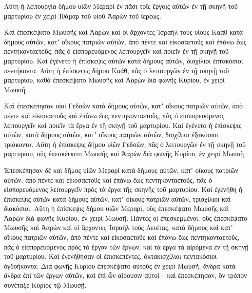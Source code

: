 {Αὕτη ἡ λειτουργία δήμου υἱῶν Μεραρὶ ἐν πᾶσι τοῖς ἔργοις αὐτῶν ἐν τῇ σκηνῇ τοῦ μαρτυρίου ἐν χειρὶ Ἰθάμαρ τοῦ υἱοῦ Ἀαρὼν τοῦ ἱερέως.
\par }{\PP {}Καὶ ἐπεσκέψατο Μωυσῆς καὶ Ἀαρὼν καὶ οἱ ἄρχοντες Ἰσραὴλ τοὺς υἱοὺς Καὰθ κατὰ δήμους αὐτῶν, κατʼ οἴκους πατριῶν αὐτῶν,
ἀπὸ πέντε καὶ εἰκοσαετοῦς καὶ ἐπάνω ἕως πεντηκονταετοῦς, πᾶς ὁ εἰσπορευόμενος λειτουργεῖν καὶ ποιεῖν ἐν τῇ σκηνῇ τοῦ μαρτυρίου.
Καὶ ἐγένετο ἡ ἐπίσκεψις αὐτῶν κατὰ δήμους αὐτῶν, δισχίλιοι ἑπτακόσιοι πεντήκοντα.
Αὕτη ἡ ἐπίσκεψις δήμου Καάθ, πᾶς ὁ λειτουργῶν ἐν τῇ σκηνῇ τοῦ μαρτυρίου, καθὰ ἐπεσκέψατο Μωυσῆς καὶ Ἀαρὼν διὰ φωνῆς Κυρίου, ἐν χειρὶ Μωυσῆ.
\par }{\PP {}Καὶ ἐπεσκέπησαν υἱοὶ Γεδσὼν κατὰ δήμους αὐτῶν, κατʼ οἴκους πατριῶν αὐτῶν,
ἀπὸ πέντε καὶ εἰκοσαετοῦς καὶ ἐπάνω ἕως πεντηκονταετοῦς, πᾶς ὁ εἰσπορευόμενος λειτουργεῖν καὶ ποιεῖν τὰ ἔργα ἐν τῇ σκηνῇ τοῦ μαρτυρίου.
Καὶ ἐγένετο ἡ ἐπίσκεψις αὐτῶν, κατὰ δήμους αὐτῶν, κατʼ οἴκους πατριῶν αὐτῶν, δισχίλιοι ἑξακόσιοι τριάκοντα.
Αὕτη ἡ ἐπίσκεψις δήμου υἱῶν Γεδσὼν, πᾶς ὁ λειτουργῶν ἐν τῇ σκηνῇ τοῦ μαρτυρίου, οὓς ἐπεσκέψατο Μωυσῆς καὶ Ἀαρὼν διὰ φωνῆς Κυρίου, ἐν χειρὶ Μωυσῆ.
\par }{\PP {}Ἐπεσκέπησαν δὲ καὶ δῆμος υἱῶν Μεραρὶ κατὰ δήμους αὐτῶν, κατʼ οἴκους πατριῶν αὐτῶν,
ἀπὸ πέντε καὶ εἰκοσαετοῦς καὶ ἐπάνω ἕως πεντηκονταετοῦς, πᾶς ὁ εἰσπορευόμενος λειτουργεῖν πρὸς τὰ ἔργα τῆς σκηνῆς τοῦ μαρτυρίου.
Καὶ ἐγενήθη ἡ ἐπίσκεψις αὐτῶν κατὰ δήμους αὐτῶν, κατʼ οἴκους πατριῶν αὐτῶν, τρισχίλιοι καὶ διακόσιοι.
Αὕτη ἡ ἐπίσκεψις δήμου υἱῶν Μεραρὶ, οὓς ἐπεσκέψατο Μωυσῆς καὶ Ἀαρὼν διὰ φωνῆς Κυρίου, ἐν χειρὶ Μωυσῆ.
Πάντες οἱ ἐπεσκεμμένοι, οὓς ἐπεσκέψατο Μωυσῆς καὶ Ἀαρὼν καὶ οἱ ἄρχοντες Ἰσραὴλ τοὺς Λευίτας, κατὰ δήμους καὶ κατʼ οἴκους πατριῶν αὐτῶν,
ἀπὸ πέντε καὶ εἰκοσαετοῦς καὶ ἐπάνω ἕως πεντηκονταετοῦς, πᾶς ὁ εἰσπορευόμενος πρὸς τὸ ἔργον τῶν ἔργων, καὶ τὰ ἔργα τὰ αἰρόμενα ἐν τῇ σκηνῇ τοῦ μαρτυρίου.
Καὶ ἐγενήθησαν οἱ ἐπισκεπέντες, ὀκτακισχίλιοι πεντακόσιοι ὀγδοήκοντα.
Διὰ φωνῆς Κυρίου ἐπεσκέψατο αὐτοὺς ἐν χειρὶ Μωυσῆ, ἄνδρα κατὰ ἄνδρα ἐπὶ τῶν ἔργων αὐτῶν, καὶ ἐπὶ ὧν αἴρουσιν αὐτοί· καὶ ἐπεσκέπησαν, ὃν τρόπον συνέταξε Κύριος τῷ Μωυσῇ.

}
